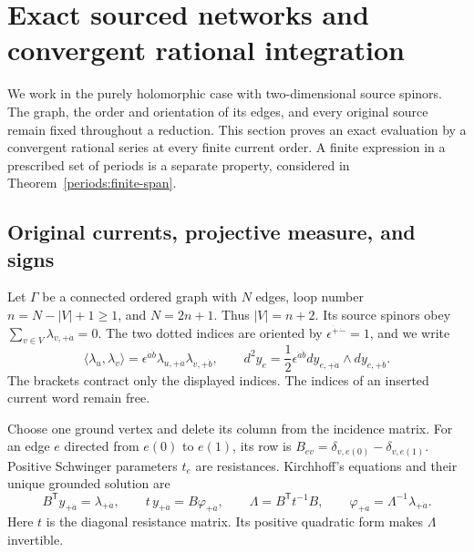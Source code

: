 \section{Exact sourced networks and convergent rational integration}
\label{networks:section}

We work in the purely holomorphic case with two-dimensional source
spinors.  The graph, the order and orientation of its edges, and every
original source remain fixed throughout a reduction.  This section proves
an exact evaluation by a convergent rational series at every finite current
order.  A finite expression in a prescribed set of periods is a separate
property, considered in Theorem~\ref{periods:finite-span}.

\subsection{Original currents, projective measure, and signs}
\label{networks:conventions}

Let $\Gamma$ be a connected ordered graph with $N$ edges, loop number
$n=N-|V|+1\ge1$, and $N=2n+1$.  Thus $|V|=n+2$.  Its source spinors obey
$\sum_{v\in V}\lambda_{v,+\dot a}=0$.  The two dotted indices are
oriented by $\epsilon^{\dot+\dot-}=1$, and we write
\begin{equation}
 \langle\lambda_u,\lambda_v\rangle
 =\epsilon^{\dot a\dot b}\lambda_{u,+\dot a}\lambda_{v,+\dot b},
 \qquad
 d^2y_e=\frac12\epsilon^{\dot a\dot b}
 dy_{e,+\dot a}\wedge dy_{e,+\dot b}.
 \label{networks:spinor-volume}
\end{equation}
The brackets contract only the displayed indices.  The indices of an
inserted current word remain free.

Choose one ground vertex and delete its column from the incidence matrix.
For an edge $e$ directed from $e(0)$ to $e(1)$, its row is
$B_{ev}=\delta_{v,e(0)}-\delta_{v,e(1)}$.  Positive Schwinger parameters
$t_e$ are resistances.  Kirchhoff's equations and their unique grounded
solution are
\begin{equation}
 B^{\mathsf T}y_{+\dot a}=\lambda_{+\dot a},\qquad
 t\,y_{+\dot a}=B\varphi_{+\dot a},\qquad
 \Lambda=B^{\mathsf T}t^{-1}B,\qquad
 \varphi_{+\dot a}=\Lambda^{-1}\lambda_{+\dot a}.
 \label{networks:kirchhoff}
\end{equation}
Here $t$ is the diagonal resistance matrix.  Its positive quadratic form
makes $\Lambda$ invertible.

